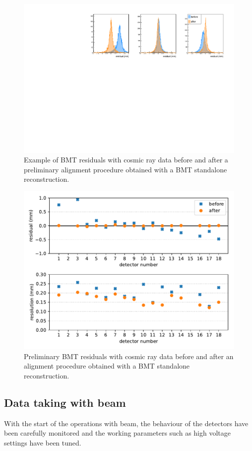 \begin{figure}[htb]
 \includegraphics[width=.45\textwidth]{images/cosmic_residuals.pdf}
 \caption{Example of BMT residuals with cosmic ray data before and after a preliminary alignment procedure obtained with a BMT standalone reconstruction.}
 \label{fig:mm-cosmic_residuals}
\end{figure}

\begin{figure}[htb]
 \includegraphics[width=\columnwidth]{images/residuals_and_resolutions.pdf}
 \caption{Preliminary BMT residuals with cosmic ray data before and after an alignment procedure obtained with a BMT standalone reconstruction.}
 \label{fig:mm-cosmic_res_summary}
\end{figure}

\subsection{Data taking with beam}

With the start of the operations with beam, the behaviour of the detectors have been carefully monitored and the working parameters such as high voltage settings have been tuned.


